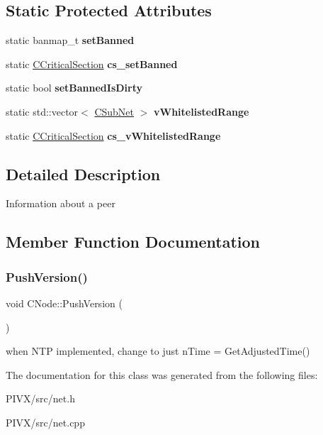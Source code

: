 \subsection*{Static Protected Attributes}
\begin{DoxyCompactItemize}
\item 
\mbox{\label{class_c_node_a7826e80a91a69a0c62d9194d866a9320}} 
static banmap\+\_\+t {\bfseries set\+Banned}
\item 
\mbox{\label{class_c_node_a9ff9a6f07a280aa07d77713ae43d383a}} 
static \mbox{\hyperlink{class_annotated_mixin}{C\+Critical\+Section}} {\bfseries cs\+\_\+set\+Banned}
\item 
\mbox{\label{class_c_node_af9a307a7a95d50c600301ed506204794}} 
static bool {\bfseries set\+Banned\+Is\+Dirty}
\item 
\mbox{\label{class_c_node_afaac354c1226990e4e9407ba2ee4cbf9}} 
static std\+::vector$<$ \mbox{\hyperlink{class_c_sub_net}{C\+Sub\+Net}} $>$ {\bfseries v\+Whitelisted\+Range}
\item 
\mbox{\label{class_c_node_a4a79c02f5024b57ca9e6a1f8d103f363}} 
static \mbox{\hyperlink{class_annotated_mixin}{C\+Critical\+Section}} {\bfseries cs\+\_\+v\+Whitelisted\+Range}
\end{DoxyCompactItemize}


\subsection{Detailed Description}
Information about a peer 

\subsection{Member Function Documentation}
\mbox{\label{class_c_node_a4dbfe4f6c1fd162aaa905e4bd201d536}} 
\subsubsection{\texorpdfstring{Push\+Version()}{PushVersion()}}
{\footnotesize\ttfamily void C\+Node\+::\+Push\+Version (\begin{DoxyParamCaption}{ }\end{DoxyParamCaption})}

when N\+TP implemented, change to just n\+Time = Get\+Adjusted\+Time() 

The documentation for this class was generated from the following files\+:\begin{DoxyCompactItemize}
\item 
P\+I\+V\+X/src/net.\+h\item 
P\+I\+V\+X/src/net.\+cpp\end{DoxyCompactItemize}
